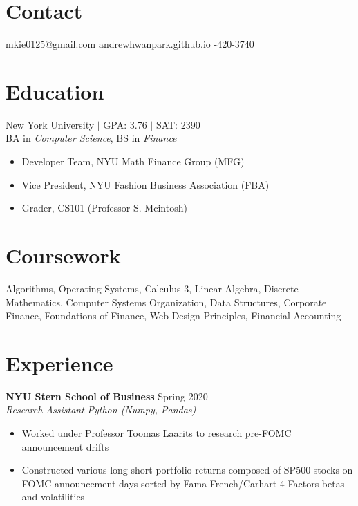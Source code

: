 \documentclass[margin]{res}
\begin{document}
 
 
 
\begin{resume} 
	 
	\section{Contact} 
	mkie0125@gmail.com \quad\quad\quad andrewhwanpark.github.io \quad\quad{}-420-3740
	
	\section{Education} 
	New York University $\vert$ GPA: 3.76 $\vert$ SAT: 2390 \\
	BA in {\it Computer Science}, BS in {\it Finance} 
	
	\begin{itemize} \itemsep -2pt  %
		\item Developer Team, NYU Math Finance Group (MFG)
		\item Vice President, NYU Fashion Business Association (FBA)
		\item Grader, CS101 (Professor S. Mcintosh)
	\end{itemize}
	
	\section{Coursework}
	Algorithms, Operating Systems, Calculus 3, Linear Algebra, Discrete Mathematics, Computer Systems Organization, Data Structures, Corporate Finance, Foundations of Finance, Web Design Principles, Financial Accounting
	
	\section{Experience}
	{\bf NYU Stern School of Business} \hfill Spring 2020\\
	{\it Research Assistant} \hfill {\it Python (Numpy, Pandas)}
	\begin{itemize} \itemsep -2pt  %
		\item Worked under Professor Toomas Laarits to research pre-FOMC announcement drifts
		\item Constructed various long-short portfolio returns composed of SP500 stocks on FOMC announcement days sorted by Fama French/Carhart 4 Factors betas and volatilities
	\end{itemize}
	

\end{resume}
\end{document}
